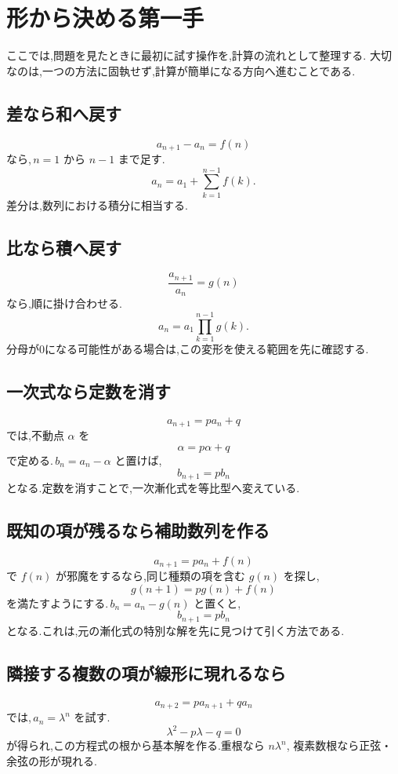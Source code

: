 
\section{形から決める第一手}

ここでは,問題を見たときに最初に試す操作を,計算の流れとして整理する.
大切なのは,一つの方法に固執せず,計算が簡単になる方向へ進むことである.

\subsection{差なら和へ戻す}

\[
  a_{n+1}-a_n=f(n)
\]
なら,\,$n=1$ から $n-1$ まで足す.
\[
  a_n=a_1+\sum_{k=1}^{n-1}f(k).
\]
差分は,数列における積分に相当する.

\subsection{比なら積へ戻す}

\[
  \frac{a_{n+1}}{a_n}=g(n)
\]
なら,順に掛け合わせる.
\[
  a_n=a_1\prod_{k=1}^{n-1}g(k).
\]
分母が0になる可能性がある場合は,この変形を使える範囲を先に確認する.

\subsection{一次式なら定数を消す}

\[
  a_{n+1}=pa_n+q
\]
では,不動点 $\alpha$ を
\[
  \alpha=p\alpha+q
\]
で定める.\,$b_n=a_n-\alpha$ と置けば,
\[
  b_{n+1}=pb_n
\]
となる.定数を消すことで,一次漸化式を等比型へ変えている.

\subsection{既知の項が残るなら補助数列を作る}

\[
  a_{n+1}=pa_n+f(n)
\]
で $f(n)$ が邪魔をするなら,同じ種類の項を含む $g(n)$ を探し,
\[
  g(n+1)=pg(n)+f(n)
\]
を満たすようにする.\,$b_n=a_n-g(n)$ と置くと,
\[
  b_{n+1}=pb_n
\]
となる.これは,元の漸化式の特別な解を先に見つけて引く方法である.

\subsection{隣接する複数の項が線形に現れるなら}

\[
  a_{n+2}=pa_{n+1}+qa_n
\]
では,\,$a_n=\lambda^n$ を試す.
\[
  \lambda^2-p\lambda-q=0
\]
が得られ,この方程式の根から基本解を作る.重根なら $n\lambda^n$,
複素数根なら正弦・余弦の形が現れる.

